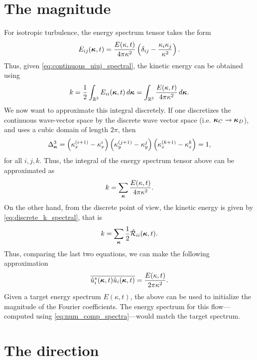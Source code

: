 \documentclass[oneside,a4paper,11pt]{report}
\newcommand{\tpvc}{\mathcal{R}} %
\newcommand{\est}{E}            %
\begin{document}
\section{The magnitude}
For isotropic turbulence, the energy spectrum tensor takes the form
\begin{equation}
    \est_{ij}(\kvec,t) = \frac{\est(\kappa,t)}{4 \pi \kappa^2} \left ( \delta_{ij} - \frac{\kappa_i \kappa_j}{\kappa^2} \right ).
\end{equation}
Thus, given \cref{eq:continuous_uiuj_spectral}, the kinetic energy can be obtained using
\begin{equation}
    k = \frac{1}{2} \int_\Rthree \est_{ii}(\kvec,t) \, d\kvec = \int_\Rthree \frac{\est(\kappa,t)}{4 \pi \kappa^2} \, d\kvec.
\end{equation}
We now want to approximate this integral discretely. If one discretizes the continuous wave-vector space by the discrete wave vector space (i.e. $\boldsymbol\kappa_C \to \boldsymbol\kappa_D$), and uses a cubic domain of length $2 \pi$, then 
\begin{equation}
    \Delta^3_{\boldsymbol\kappa} = \left ( \kappa_x^{(i+1)} - \kappa_x^{i} \right ) \left ( \kappa_y^{(j+1)} - \kappa_y^{j} \right ) \left ( \kappa_z^{(k+1)} - \kappa_z^{k} \right ) = 1,
\end{equation}
for all $i,j,k$. Thus, the integral of the energy spectrum tensor above can be approximated as
\begin{equation}
    k = \sum_{\kvec} \frac{\est(\kappa,t)}{4 \pi \kappa^2}.
\end{equation}
On the other hand, from the discrete point of view, the kinetic energy is given by \cref{eq:discrete_k_spectral}, that is
\begin{equation}
    k = \sum_{\kvec} \frac{1}{2} \hat{\tpvc}_{ii}(\kvec,t).
\end{equation}
Thus, comparing the last two equations, we can make the following approximation
\begin{equation}
    \overline{ \hat{u}_i^*(\kvec,t) \hat{u}_i(\kvec,t)} = \frac{\est(\kappa,t)}{2 \pi \kappa^2}.
\end{equation}
Given a target energy spectrum $E(\kappa,t)$, the above can be used to initialize the magnitude of the Fourier coefficients. The energy spectrum for this flow---computed using \cref{eq:num_comp_spectra}---would match the target spectrum. 

\section{The direction}



\end{document}
